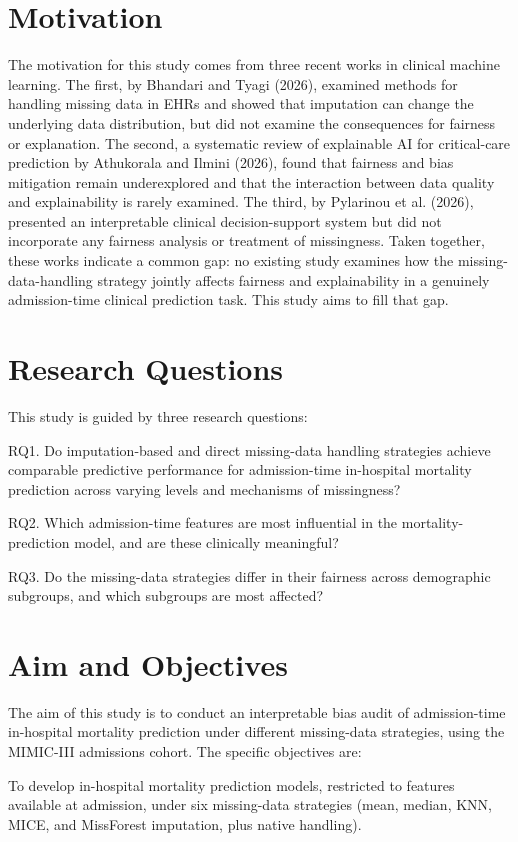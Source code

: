 \documentclass[12pt,a4paper]{report}
\begin{document}
\section{Motivation}
The motivation for this study comes from three recent works in clinical machine learning. The first, by Bhandari and Tyagi (2026), examined methods for handling missing data in EHRs and showed that imputation can change the underlying data distribution, but did not examine the consequences for fairness or explanation. The second, a systematic review of explainable AI for critical-care prediction by Athukorala and Ilmini (2026), found that fairness and bias mitigation remain underexplored and that the interaction between data quality and explainability is rarely examined. The third, by Pylarinou et al. (2026), presented an interpretable clinical decision-support system but did not incorporate any fairness analysis or treatment of missingness. Taken together, these works indicate a common gap: no existing study examines how the missing-data-handling strategy jointly affects fairness and explainability in a genuinely admission-time clinical prediction task. This study aims to fill that gap.


\section{Research Questions}
This study is guided by three research questions:

RQ1. Do imputation-based and direct missing-data handling strategies achieve comparable predictive performance for admission-time in-hospital mortality prediction across varying levels and mechanisms of missingness?

RQ2. Which admission-time features are most influential in the mortality-prediction model, and are these clinically meaningful?

RQ3. Do the missing-data strategies differ in their fairness across demographic subgroups, and which subgroups are most affected?


\section{Aim and Objectives}
The aim of this study is to conduct an interpretable bias audit of admission-time in-hospital mortality prediction under different missing-data strategies, using the MIMIC-III admissions cohort. The specific objectives are:

To develop in-hospital mortality prediction models, restricted to features available at admission, under six missing-data strategies (mean, median, KNN, MICE, and MissForest imputation, plus native handling).
\end{document}
